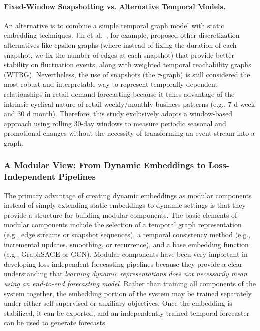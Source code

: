\paragraph{Fixed-Window Snapshotting vs. Alternative Temporal Models.}
An alternative is to combine a simple temporal graph model with static embedding techniques. Jin et al.~\cite{jin2022generalizing}, for example, proposed other discretization alternatives like epsilon-graphs (where instead of fixing the duration of each snapshot, we fix the number of edges at each snapshot) that provide better stability on fluctuation events, along with weighted temporal reachability graphs (WTRG). Nevertheless, the use of snapshots (the $\tau$-graph) is still considered the most robust and interpretable way to represent temporally dependent relationships in retail demand forecasting because it takes advantage of the intrinsic cyclical nature of retail weekly/monthly business patterns (e.g., 7 d week and 30 d month). Therefore, this study exclusively adopts a window-based approach using rolling 30-day windows to measure periodic seasonal and promotional changes without the necessity of transforming an event stream into a graph.


\subsubsection{A Modular View: From Dynamic Embeddings to Loss-Independent Pipelines}
\label{ss:dyn-modular}

The primary advantage of creating dynamic embeddings as modular components instead of simply extending static embeddings to dynamic settings is that they provide a structure for building modular components. The basic elements of modular components include the selection of a temporal graph representation (e.g., edge streams or snapshot sequences), a temporal consistency method (e.g., incremental updates, smoothing, or recurrence), and a base embedding function (e.g., \ac{GraphSAGE} or \ac{GCN}). Modular components have been very important in developing loss-independent forecasting pipelines because they provide a clear understanding that \textit{learning dynamic representations does not necessarily mean using an end-to-end forecasting model}. Rather than training all components of the system together, the embedding portion of the system may be trained separately under either self-supervised or auxiliary objectives. Once the embedding is stabilized, it can be exported, and an independently trained temporal forecaster can be used to generate forecasts.

